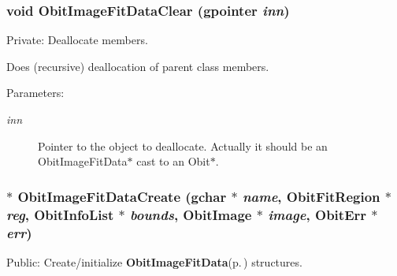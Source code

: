 \subsubsection{\setlength{\rightskip}{0pt plus 5cm}void Obit\-Image\-Fit\-Data\-Clear (gpointer {\em inn})}\label{ObitImageFitData_8c_a4}


Private: Deallocate members. 

Does (recursive) deallocation of parent class members. \begin{Desc}
\item[Parameters:]
\begin{description}
\item[{\em inn}]Pointer to the object to deallocate. Actually it should be an Obit\-Image\-Fit\-Data$\ast$ cast to an Obit$\ast$. \end{description}
\end{Desc}
\subsubsection{$\ast$ Obit\-Image\-Fit\-Data\-Create (gchar $\ast$ {\em name}, {\bf Obit\-Fit\-Region} $\ast$ {\em reg}, {\bf Obit\-Info\-List} $\ast$ {\em bounds}, {\bf Obit\-Image} $\ast$ {\em image}, {\bf Obit\-Err} $\ast$ {\em err})}\label{ObitImageFitData_8c_a9}


Public: Create/initialize {\bf Obit\-Image\-Fit\-Data}{\rm (p.\,\pageref{structObitImageFitData})} structures. 

